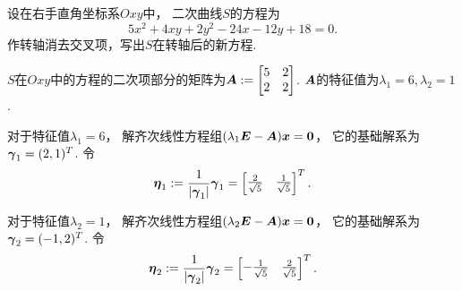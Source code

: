 \begin{example}
设在右手直角坐标系\(Oxy\)中，
二次曲线\(S\)的方程为\begin{equation*}
	5x^2 + 4xy + 2y^2 - 24x - 12y + 18 = 0.
\end{equation*}
作转轴消去交叉项，写出\(S\)在转轴后的新方程.
\begin{solution}
\(S\)在\(Oxy\)中的方程的二次项部分的矩阵为\(
	\boldsymbol{A} := \begin{bmatrix}
		5 & 2 \\
		2 & 2
	\end{bmatrix}
\).
\(\boldsymbol{A}\)的特征值为\(
	\lambda_1 = 6,
	\lambda_2 = 1
\).

对于特征值\(\lambda_1 = 6\)，
解齐次线性方程组\((\lambda_1 \boldsymbol{E} - \boldsymbol{A}) \boldsymbol{x} = \boldsymbol0\)，
它的基础解系为\(\boldsymbol\gamma_1 = (2,1)^T\).
令\begin{equation*}
	\boldsymbol\eta_1
	:= \frac1{\abs{\boldsymbol\gamma_1}} \boldsymbol\gamma_1
	= \begin{bmatrix}
		\frac2{\sqrt5} & \frac1{\sqrt5}
	\end{bmatrix}^T.
\end{equation*}

对于特征值\(\lambda_2 = 1\)，
解齐次线性方程组\((\lambda_2 \boldsymbol{E} - \boldsymbol{A}) \boldsymbol{x} = \boldsymbol0\)，
它的基础解系为\(\boldsymbol\gamma_2 = (-1,2)^T\).
令\begin{equation*}
	\boldsymbol\eta_2
	:= \frac1{\abs{\boldsymbol\gamma_2}} \boldsymbol\gamma_2
	= \begin{bmatrix}
		-\frac1{\sqrt5} & \frac2{\sqrt5}
	\end{bmatrix}^T.
\end{equation*}


\end{solution}
\end{example}
